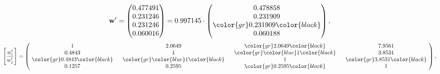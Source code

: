 \begin{example}
\begin{equation*}
\mathbf{w}^{\prime} =
\begin{pmatrix}
0.477491\\
0.231246\\
0.231246\\
0.060016
\end{pmatrix} =
0.997145\cdot
\begin{pmatrix}
0.478858\\
0.231909\\
\color{gr} 0.231909\color{black} \\
0.060188
\end{pmatrix},
\end{equation*}
\begin{equation*}
\left[ \frac{{w}^{\prime}_i}{{w}^{\prime}_j} \right] =
\begin{pmatrix}
$\,\,$ 1 $\,\,$ & $\,\,$2.0649$\,\,$ & $\,\,$\color{gr} 2.0649\color{black} $\,\,$ & $\,\,$7.9561$\,\,$ \\
$\,\,$0.4843$\,\,$ & $\,\,$ 1 $\,\,$ & $\,\,$\color{gr} \color{blue} 1\color{black} $\,\,$ & $\,\,$3.8531  $\,\,$ \\
$\,\,$\color{gr} 0.4843\color{black} $\,\,$ & $\,\,$\color{gr} \color{blue} 1\color{black} $\,\,$ & $\,\,$ 1 $\,\,$ & $\,\,$\color{gr} 3.8531\color{black}  $\,\,$ \\
$\,\,$0.1257$\,\,$ & $\,\,$0.2595$\,\,$ & $\,\,$\color{gr} 0.2595\color{black} $\,\,$ & $\,\,$ 1  $\,\,$ \\
\end{pmatrix},
\end{equation*}
\end{example}
\newpage
